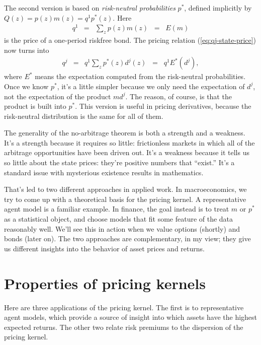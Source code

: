 \documentclass[11pt]{article}
\begin{document}
The second version is based on
{\it risk-neutral probabilities\/} $p^*$,
defined implicitly by $ Q(z) = p(z) m(z) = q^1 p^*(z)$.
Here
\begin{eqnarray*}
    q^1 &=& \sum_z p(z) m(z) \;\;=\;\; E(m)
\end{eqnarray*}
is the price of a one-period riskfree bond.
The pricing relation (\ref{eq:qj-state-price}) now turns into
\begin{eqnarray}
    q^j &=& q^1 \sum_z p^*(z) d^j(z)  \;\;=\;\; q^1 E^* (d^j) ,
    \label{eq:q=Estar-d}
\end{eqnarray}
where $E^*$ means the expectation computed from the risk-neutral probabilities.
Once we know $p^*$, it's a little simpler because we only need the
expectation of $d^j$, not the expectation of the product $m d^j$.
The reason, of course, is that the product is built into $p^*$.
This version is useful in pricing derivatives,
because the risk-neutral distribution is the same for all of them.

The generality of the no-arbitrage theorem is both a strength
and a weakness.
It's a strength because it requires so little:  frictionless
markets in which all of the arbitrage opportunities have been driven out.
It's a weakness because it tells us so little about the state prices:
they're positive numbers that ``exist.''
It's a standard issue with mysterious existence results in mathematics.

That's led to two different approaches in applied work. 
In macroeconomics, we try to come up with a theoretical basis for the pricing kernel.
A representative agent model is a familiar example.
In finance, the goal instead is to treat $m$ or $p^*$ as a statistical object,
and choose models that fit some feature of the data reasonably
well.
We'll see this in action when we value options (shortly) and bonds (later on).
The two approaches are complementary, in my view; they give us different
insights into the behavior of asset prices and returns.


\section{Properties of pricing kernels}

Here are three applications of the pricing kernel.
The first is to representative agent models,
which provide a source of insight into which assets have
the highest expected returns.
The other two relate risk premiums to the dispersion of the pricing kernel.
\end{document}
